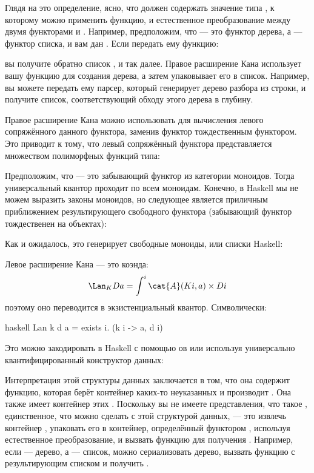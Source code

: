 Глядя на это определение, ясно, что  должен содержать
значение типа , к которому можно применить функцию, и
естественное преобразование между двумя функторами  и
. Например, предположим, что  — это функтор дерева,
а  — функтор списка, и вам дан
. Если передать ему функцию:

вы получите обратно список , и так далее. Правое расширение
Кана использует вашу функцию для создания дерева, а затем упаковывает его
в список. Например, вы можете передать ему парсер, который генерирует
дерево разбора из строки, и получите список, соответствующий
обходу этого дерева в глубину.

Правое расширение Кана можно использовать для вычисления левого сопряжённого
данного функтора, заменив функтор  тождественным
функтором. Это приводит к тому, что левый сопряжённый функтора  представляется
множеством полиморфных функций типа:

Предположим, что  — это забывающий функтор из категории
моноидов. Тогда универсальный квантор проходит по всем моноидам. Конечно,
в Haskell мы не можем выразить законы моноидов, но следующее является
приличным приближением результирующего свободного функтора (забывающий
функтор  тождественен на объектах):

Как и ожидалось, это генерирует свободные моноиды, или списки Haskell:

Левое расширение Кана — это коэнда:
\[\Lan_{K}D a = \int^i \cat{A}(K i, a)\times{}D i\]
поэтому оно переводится в экзистенциальный квантор. Символически:

\begin{snip}{haskell}
Lan k d a = exists i. (k i -> a, d i)
\end{snip}
Это можно закодировать в Haskell с помощью ов или используя универсально
квантифицированный конструктор данных:

Интерпретация этой структуры данных заключается в том, что она содержит функцию,
которая берёт контейнер каких-то неуказанных  и производит
. Она также имеет контейнер этих . Поскольку вы
не имеете представления, что такое , единственное, что можно сделать с этой структурой данных, — это извлечь контейнер , упаковать его в
контейнер, определённый функтором , используя естественное
преобразование, и вызвать функцию для получения . Например,
если  — дерево, а  — список, можно
сериализовать дерево, вызвать функцию с результирующим списком и
получить .

